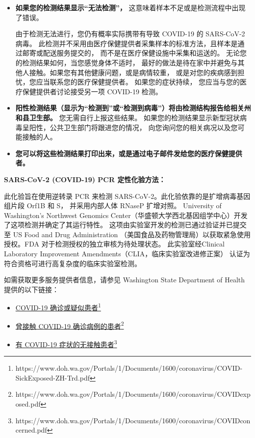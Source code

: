 \documentclass[10pt]{article}
\newcommand{\link}[2]{\href{#1}{#2}\footnote{#1}}
\begin{document}
\begin{itemize}
\item

  \textbf{如果您的检测结果显示``无法检测''，} 这意味着样本不足或是检测流程中出现了错误。

  由于检测无法进行，您仍有概率实际携带有导致 COVID-19 的 SARS-CoV-2 病毒。
  此检测并不采用由医疗保健提供者采集样本的标准方法，且样本是通过邮寄或配送服务提交的，
  而不是在医疗保健设施中采集和运送的。 无论您的检测结果如何，当您感觉身体不适时，
  最好的做法是待在家中并避免与其他人接触。如果您有其他健康问题，或是病情较重，
  或是对您的疾病感到担忧，您应当联系您的医疗保健提供者。 如果您的症状持续，
  您应当与您的医疗保健提供者讨论接受另一项 COVID-19 检测。

\item

  \textbf{阳性检测结果（显示为``检测到''或``检测到病毒''）将由检测结构报告给相关州和县卫生部。}
  您无需自行上报这些结果。 如果您的检测结果显示新型冠状病毒呈阳性，公共卫生部门将跟进您的情况，
  向您询问您的相关病况以及您可能接触的人。

\item

  \textbf{您可以将这些检测结果打印出来，或是通过电子邮件发给您的医疗保健提供者。}

\end{itemize}

\bigskip
\textbf{SARS-CoV-2 (COVID-19) PCR 定性化验方法：}

此化验旨在使用逆转录 PCR 来检测 SARS-CoV-2。此化验依靠的是扩增病毒基因组片段 Orf1B 和 S，
并采用内部人体 RNaseP 扩增对照。 University of Washington’s Northwest Genomics
Center（华盛顿大学西北基因组学中心）开发了这项检测并确定了其运行特性。
这项由实验室开发的检测已通过验证并已提交至 US Food and Drug Administration
（美国食品及药物管理局）以获取紧急使用授权。FDA 对于检测授权的独立审核为待处理状态。
此实验室经Clinical Laboratory Improvement Amendments（CLIA，临床实验室改进修正案）
认证为符合资格可进行高复杂度的临床实验室检测。

如需获取更多服务提供者信息，请参见 Washington State Department of Health 提供的以下链接：

\begin{itemize}
\item

  \link{https://www.doh.wa.gov/Portals/1/Documents/1600/coronavirus/COVID-SickExposed-ZH-Trd.pdf}{COVID-19
  确诊或疑似患者}

\item

  \link{https://www.doh.wa.gov/Portals/1/Documents/1600/coronavirus/COVIDexposed.pdf}{曾接触
  COVID-19 确诊病例的患者}

\item

  \link{https://www.doh.wa.gov/Portals/1/Documents/1600/coronavirus/COVIDconcerned.pdf}{有
  COVID-19 症状的无接触患者}

\end{itemize}
\end{document}
